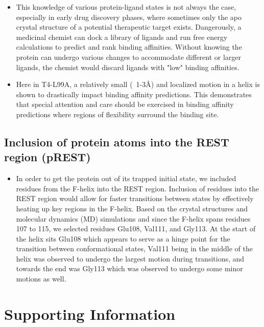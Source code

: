 \documentclass{article}
\begin{document}
\begin{itemize}
   \item This knowledge of various protein-ligand states is not always the case, especially in early drug discovery phases, where sometimes only the apo crystal structure of a potential therapeutic target exists.
      Dangerously, a medicinal chemist can dock a library of ligands and run free energy calculations to predict and rank binding affinities.
      Without knowing the protein can undergo various changes to accommodate different or larger ligands, the chemist would discard ligands with "low" binding affinities.
   \item Here in T4-L99A, a relatively small (~1-3\AA) and localized motion in a helix is shown to drastically impact binding affinity predictions.
      This demonstrates that special attention and care should be exercised in binding affinity predictions where regions of flexibility surround the binding site.
   \end{itemize}
      
\subsection{Inclusion of protein atoms into the REST region (pREST)}
   \begin{itemize}
   \item In order to get the protein out of its trapped initial state, we included residues from the F-helix into the REST region.
      Inclusion of residues into the REST region would allow for faster transitions between states by effectively heating up key regions in the F-helix.
      Based on the crystal structures and molecular dynamics (MD) simulations and since the F-helix spans residues 107 to 115, we selected residues Glu108, Val111, and Gly113.
      At the start of the helix sits Glu108 which appears to serve as a hinge point for the transition between conformational states,
      Val111 being in the middle of the helix was observed to undergo the largest motion during transitions, 
      and towards the end was Gly113 which was observed to undergo some minor motions as well.
     




   \end{itemize}



\section{Supporting Information}   
\end{document}
